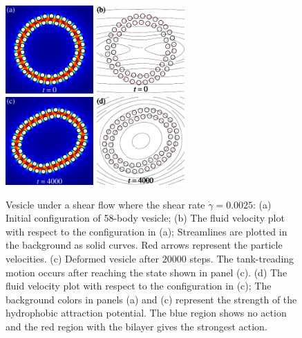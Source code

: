 \documentclass[lineno]{jfm}
\begin{document}
\begin{figure}
\centering
\includegraphics[width=0.3\textwidth]{N58_0.pdf}
\includegraphics[width=0.3\textwidth]{N58_vel_0.pdf}\\
\includegraphics[width=0.3\textwidth]{N58_20000.pdf}
\includegraphics[width=0.3\textwidth]{N58_vel_20000.pdf}
  \caption{Vesicle under a shear flow where the shear rate $\dot\gamma=0.0025$: 
  (a) Initial configuration of 58-body vesicle; 
  (b) The fluid velocity plot with respect to the configuration in (a); Streamlines are plotted in the background
  as solid curves. Red arrows represent the particle velocities.
  (c) Deformed vesicle after $20000$ steps. The tank-treading motion occurs after reaching the state shown in panel (c).
  (d) The fluid velocity plot with respect to the configuration in (c);
  The background colors in panels (a) and (c) represent the strength of the hydrophobic attraction potential. The blue region shows no action and the red region with the bilayer gives the strongest action.
  }
    \label{figure3}
\end{figure}
%
\end{document}
